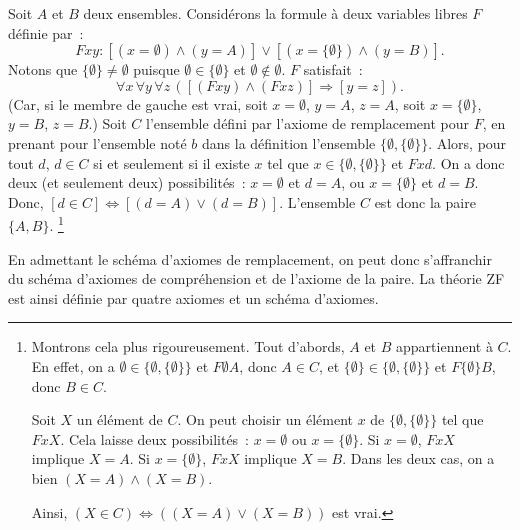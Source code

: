 Soit $A$ et $B$ deux ensembles. 
Considérons la formule à deux variables libres $F$ définie par : 
\begin{equation*}
    F x y: [(x = \emptyset) \wedge (y = A)] \vee [(x = \lbrace \emptyset \rbrace) \wedge (y = B)].
\end{equation*}
Notons que $\lbrace \emptyset \rbrace \neq \emptyset$ puisque $\emptyset \in \lbrace \emptyset \rbrace$ et $\emptyset \notin \emptyset$. 
$F$ satisfait : 
\begin{equation*}
    \forall x \, \forall y \, \forall z \, ([ (F x y) \wedge (F x z)] \Rightarrow [y = z] ).
\end{equation*}
(Car, si le membre de gauche est vrai, soit $x = \emptyset$, $y = A$, $z = A$, soit $x = \lbrace \emptyset \rbrace$, $y = B$, $z = B$.)
Soit $C$ l'ensemble défini par l'axiome de remplacement pour $F$, en prenant pour l'ensemble noté $b$ dans la définition l'ensemble $\lbrace \emptyset, \lbrace \emptyset \rbrace \rbrace$. 
Alors, pour tout $d$, $d \in C$ si et seulement si il existe $x$ tel que $x \in \lbrace \emptyset, \lbrace \emptyset \rbrace \rbrace$ et $F x d$. 
On a donc deux (et seulement deux) possibilités : $x = \emptyset$ et $d = A$, ou $x = \lbrace \emptyset \rbrace$ et $d = B$. 
Donc, $[d \in C] \Leftrightarrow [(d = A) \vee (d = B)]$.
L'ensemble $C$ est donc la paire $\lbrace A, B \rbrace$.%
\footnote{
    Montrons cela plus rigoureusement. 
    Tout d'abords, $A$ et $B$ appartiennent à $C$. 
    En effet, on a $\emptyset \in \lbrace \emptyset, \lbrace \emptyset \rbrace \rbrace$ et $F \emptyset A$, donc $A \in C$, et $\lbrace \emptyset \rbrace \in \lbrace \emptyset, \lbrace \emptyset \rbrace \rbrace$ et $F \lbrace \emptyset \rbrace B$, donc $B \in C$.
    
    Soit $X$ un élément de $C$. 
    On peut choisir un élément $x$ de $\lbrace \emptyset, \lbrace \emptyset \rbrace \rbrace$ tel que $F x X$. 
    Cela laisse deux possibilités : $x = \emptyset$ ou $x = \lbrace \emptyset \rbrace$. 
    Si $x = \emptyset$, $F x X$ implique $X = A$.
    Si $x = \lbrace \emptyset \rbrace $, $F x X$ implique $X = B$. 
    Dans les deux cas, on a bien $(X = A) \wedge (X = B)$. 

    Ainsi, $(X \in C) \Leftrightarrow ((X = A) \vee (X = B))$ est vrai.
}

\hfill\square

\medskip

En admettant le schéma d'axiomes de remplacement, on peut donc s'affranchir du schéma d'axiomes de compréhension et de l'axiome de la paire. 
La théorie ZF est ainsi définie par quatre axiomes et un schéma d'axiomes. 

